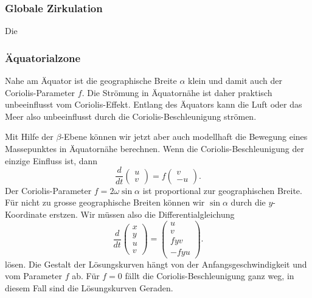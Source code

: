 \subsubsection{Globale Zirkulation}
Die 

\subsubsection{Äquatorialzone}
Nahe am Äquator ist die geographische Breite $\alpha$ klein und
damit auch der Coriolis-Parameter $f$.
Die Strömung in Äquatornähe ist daher praktisch unbeeinflusst 
vom Coriolis-Effekt.
Entlang des Äquators kann die Luft oder das Meer also
unbeeinflusst durch die Coriolis-Beschleunigung strömen.

Mit Hilfe der $\beta$-Ebene können wir jetzt aber auch modellhaft 
die Bewegung eines Massepunktes in Äquatornähe berechnen.
Wenn die Coriolis-Beschleunigung der einzige Einfluss ist, dann
\begin{equation}
\frac{d}{dt}
\begin{pmatrix}u\\v\end{pmatrix}
=
f\begin{pmatrix}v\\-u\end{pmatrix}.
\end{equation}
Der Coriolis-Parameter $f=2\omega\sin\alpha$ ist proportional
zur geographischen Breite.
Für nicht zu grosse geographische Breiten können wir $\sin\alpha$ durch
die $y$-Koordinate erstzen.
Wir müssen also die Differentialgleichung
\begin{equation}
\frac{d}{dt}
\begin{pmatrix}x\\y\\u\\v\end{pmatrix}
=
\begin{pmatrix}
u\\v\\fyv\\-fyu
\end{pmatrix}.
\label{skript:coriolis-dgl}
\end{equation}
lösen.
Die Gestalt der Lösungskurven hängt von der Anfangsgeschwindigkeit und
vom Parameter $f$ ab.
Für $f=0$ fällt die Coriolis-Beschleunigung ganz weg, in diesem
Fall sind die Lösungskurven Geraden.

